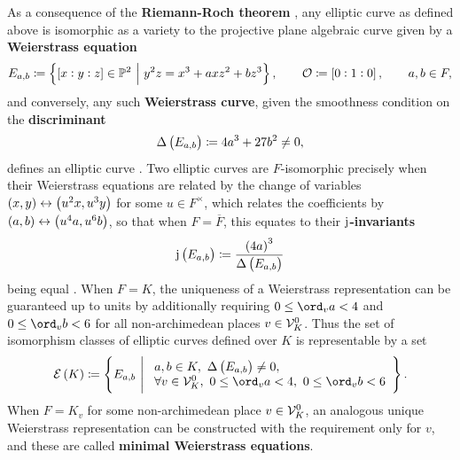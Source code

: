As a consequence of the \textbf{Riemann-Roch theorem} \cite[Theorem II.5.4]{Sil09}, any elliptic curve as defined above is isomorphic as a variety to the projective plane algebraic curve given by a \textbf{Weierstrass equation}
$$ E_{a, b} \coloneqq \cbr{\sbr{x : y : z} \in \PP^2 \st y^2z = x^3 + axz^2 + bz^3}, \qquad \OOO \coloneqq \sbr{0 : 1 : 0}, \qquad a, b \in F, $$
and conversely, any such \textbf{Weierstrass curve}, given the smoothness condition on the \textbf{discriminant}
$$ \Delta\br{E_{a, b}} \coloneqq 4a^3 + 27b^2 \ne 0, $$
defines an elliptic curve \cite[Proposition III.3.1]{Sil09}. Two elliptic curves are $ F $-isomorphic precisely when their Weierstrass equations are related by the change of variables $ \br{x, y} \leftrightarrow \br{u^2x, u^3y} $ for some $ u \in F^\times $, which relates the coefficients by $ \br{a, b} \leftrightarrow \br{u^4a, u^6b} $, so that when $ F = \overline{F} $, this equates to their \textbf{$ \mathrm{j} $-invariants}
$$ \j\br{E_{a, b}} \coloneqq \dfrac{\br{4a}^3}{\Delta\br{E_{a, b}}} $$
being equal \cite[Proposition III.1.4(b)]{Sil09}. When $ F = K $, the uniqueness of a Weierstrass representation can be guaranteed up to units by additionally requiring $ 0 \le \ord_v a < 4 $ and $ 0 \le \ord_v b < 6 $ for all non-archimedean places $ v \in \mathcal{V}_K^0 $. Thus the set of isomorphism classes of elliptic curves defined over $ K $ is representable by a set
$$ \EEE\br{K} \coloneqq \cbr{E_{a, b} \st \begin{array}{l} a, b \in K, \ \Delta\br{E_{a, b}} \ne 0, \\ \forall v \in \VVV_K^0, \ 0 \le \ord_v a < 4, \ 0 \le \ord_v b < 6 \end{array}}. $$
When $ F = K_v $ for some non-archimedean place $ v \in \mathcal{V}_K^0 $, an analogous unique Weierstrass representation can be constructed with the requirement only for $ v $, and these are called \textbf{minimal Weierstrass equations}.

